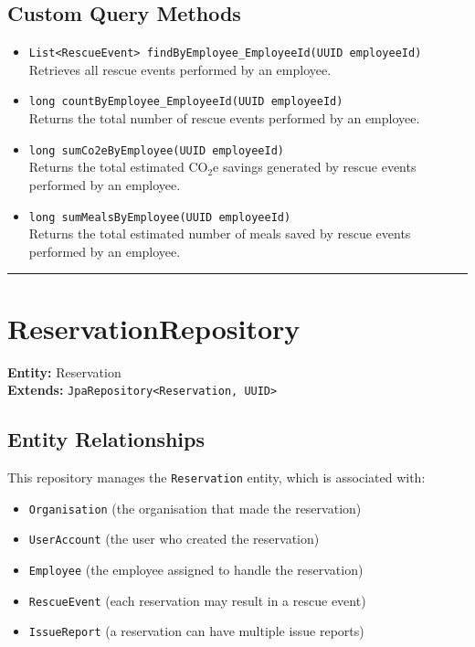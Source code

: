 \documentclass[12pt]{article}
\begin{document}
\subsection*{Custom Query Methods}
\begin{itemize}
    \item \texttt{List<RescueEvent> findByEmployee\_EmployeeId(UUID employeeId)} \\
    Retrieves all rescue events performed by an employee.

    \item \texttt{long countByEmployee\_EmployeeId(UUID employeeId)} \\
    Returns the total number of rescue events performed by an employee.

    \item \texttt{long sumCo2eByEmployee(UUID employeeId)} \\
    Returns the total estimated CO$_2$e savings generated by rescue events performed by an employee.
    
    \item \texttt{long sumMealsByEmployee(UUID employeeId)} \\
    Returns the total estimated number of meals saved by rescue events performed by an employee.
\end{itemize}





\hrule
\vspace{1em}

\section{ReservationRepository}

\textbf{Entity:} Reservation \\
\textbf{Extends:} \texttt{JpaRepository<Reservation, UUID>}

\subsection*{Entity Relationships}

This repository manages the \texttt{Reservation} entity, which is associated with:

\begin{itemize}
    \item \texttt{Organisation} (the organisation that made the reservation)
    \item \texttt{UserAccount} (the user who created the reservation)
    \item \texttt{Employee} (the employee assigned to handle the reservation)
    \item \texttt{RescueEvent} (each reservation may result in a rescue event)
    \item \texttt{IssueReport} (a reservation can have multiple issue reports)
\end{itemize}
\end{document}
